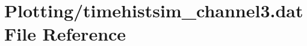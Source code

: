 \hypertarget{Plotting_2timehistsim__channel3_8dat}{}\section{Plotting/timehistsim\+\_\+channel3.dat File Reference}
\label{Plotting_2timehistsim__channel3_8dat}
